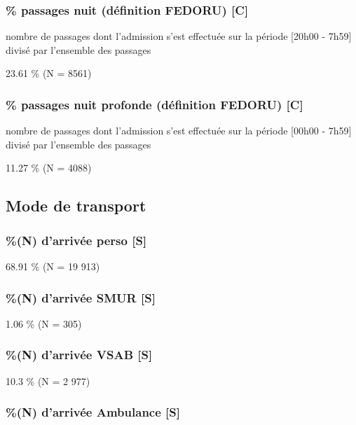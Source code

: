 \documentclass[]{article}
\begin{document}
\subsubsection{\% passages nuit (définition FEDORU)
{[}C{]}}\label{passages-nuit-definition-fedoru-c}

nombre de passages dont l'admission s'est effectuée sur la période
{[}20h00 - 7h59{]} divisé par l'ensemble des passages

23.61 \% (N = 8561)

\subsubsection{\% passages nuit profonde (définition FEDORU)
{[}C{]}}\label{passages-nuit-profonde-definition-fedoru-c}

nombre de passages dont l'admission s'est effectuée sur la période
{[}00h00 - 7h59{]} divisé par l'ensemble des passages

11.27 \% (N = 4088)

\subsection{Mode de transport}\label{mode-de-transport}

\subsubsection{\%(N) d'arrivée perso {[}S{]}}\label{n-darrivee-perso-s}

68.91 \% (N = 19 913)

\subsubsection{\%(N) d'arrivée SMUR {[}S{]}}\label{n-darrivee-smur-s}

1.06 \% (N = 305)

\subsubsection{\%(N) d'arrivée VSAB {[}S{]}}\label{n-darrivee-vsab-s}

10.3 \% (N = 2 977)

\subsubsection{\%(N) d'arrivée Ambulance
{[}S{]}}\label{n-darrivee-ambulance-s}
\end{document}
